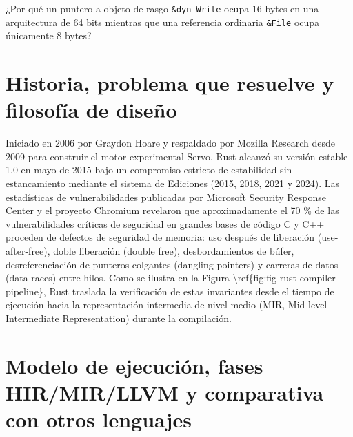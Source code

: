 \documentclass{book}
\begin{document}
\begin{tcolorbox}[title={Autoficha}, studiumcheck, breakable]

¿Por qué un puntero a objeto de rasgo \texttt{\&dyn Write} ocupa 16 bytes en una arquitectura de 64 bits mientras que una referencia ordinaria \texttt{\&File} ocupa únicamente 8 bytes?
\end{tcolorbox}

\section{Historia, problema que resuelve y filosofía de diseño}

Iniciado en 2006 por Graydon Hoare y respaldado por Mozilla Research desde 2009 para construir el motor experimental Servo, Rust alcanzó su versión estable 1.0 en mayo de 2015 bajo un compromiso estricto de estabilidad sin estancamiento mediante el sistema de Ediciones (2015, 2018, 2021 y 2024). Las estadísticas de vulnerabilidades publicadas por Microsoft Security Response Center y el proyecto Chromium revelaron que aproximadamente el 70 \% de las vulnerabilidades críticas de seguridad en grandes bases de código C y C++ proceden de defectos de seguridad de memoria: uso después de liberación (use-after-free), doble liberación (double free), desbordamientos de búfer, desreferenciación de punteros colgantes (dangling pointers) y carreras de datos (data races) entre hilos. Como se ilustra en la Figura \textbackslash{}ref\{fig:fig-rust-compiler-pipeline\}, Rust traslada la verificación de estas invariantes desde el tiempo de ejecución hacia la representación intermedia de nivel medio (MIR, Mid-level Intermediate Representation) durante la compilación.

\section{Modelo de ejecución, fases HIR/MIR/LLVM y comparativa con otros lenguajes}
\end{document}

